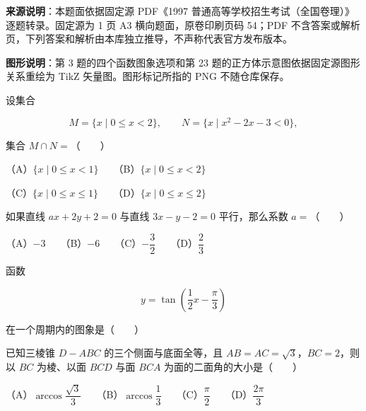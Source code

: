 


\begin{gktip}
\textbf{来源说明}：本题面依据固定源 PDF《1997 普通高等学校招生考试（全国卷理）》逐题转录。固定源为 1 页 A3 横向题面，原卷印刷页码 54；PDF 不含答案或解析页，下列答案和解析由本库独立推导，不声称代表官方发布版本。

\textbf{图形说明}：第 3 题的四个函数图象选项和第 23 题的正方体示意图依据固定源图形关系重绘为 TikZ 矢量图。图形标记所指的 PNG 不随仓库保存。
\end{gktip}

\begin{question}
设集合

\nopagebreak[4]
\[
M=\{x\mid 0\leqslant x<2\},\qquad
N=\{x\mid x^2-2x-3<0\},
\]

集合 $M\cap N=$\mbox{（　　）}

（A）$\{x\mid 0\leqslant x<1\}$　　（B）$\{x\mid 0\leqslant x<2\}$

（C）$\{x\mid 0\leqslant x\leqslant 1\}$　　（D）$\{x\mid 0\leqslant x\leqslant 2\}$

\end{question}
\begin{question}
如果直线 $ax+2y+2=0$ 与直线 $3x-y-2=0$ 平行，那么系数 $a=$\mbox{（　　）}

（A）$-3$　　（B）$-6$　　（C）$-\dfrac32$　　（D）$\dfrac23$

\Needspace{0.4\textheight}
\end{question}
\begin{question}
函数

\nopagebreak[4]
\[
y=\tan\left(\dfrac12x-\dfrac\pi3\right)
\]

在一个周期内的图象是\mbox{（　　）}
\nopagebreak[4]
\begin{center}\end{center}
\nopagebreak[4]
\end{question}
\begin{question}
已知三棱锥 $D-ABC$ 的三个侧面与底面全等，且 $AB=AC=\sqrt3$，$BC=2$，则以 $BC$ 为棱、以面 $BCD$ 与面 $BCA$ 为面的二面角的大小是\mbox{（　　）}

（A）$\arccos\dfrac{\sqrt3}{3}$　　（B）$\arccos\dfrac13$　　（C）$\dfrac\pi2$　　（D）$\dfrac{2\pi}3$

\end{question}
